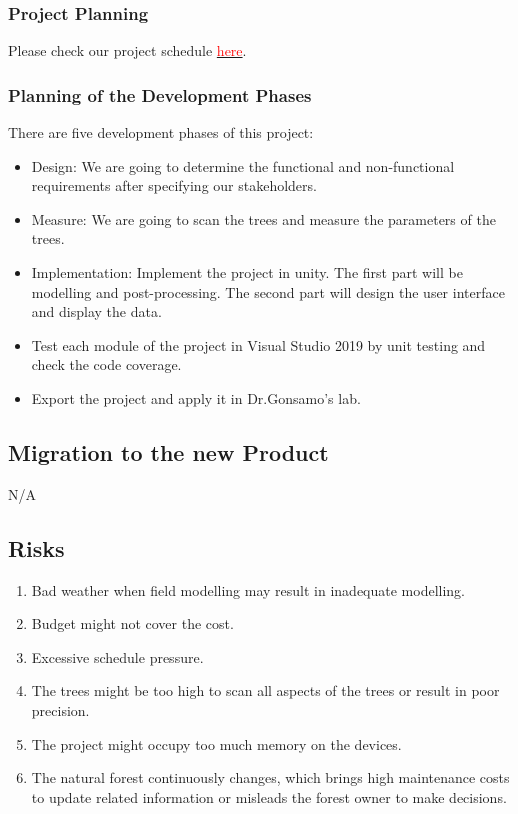 \documentclass{article}
\begin{document}
\subsubsection{Project Planning}
Please check our project schedule \href{https://github.com/wuj187/DigitalTwinCAS/tree/main/docs/DevelopmentPlan/Project_Schedule}{\textcolor{red}{here}}.
\subsubsection{Planning of the Development Phases}
There are five development phases of this project:
\begin{itemize}
    \item Design: We are going to determine the functional and non-functional requirements after specifying our stakeholders.
    \item Measure: We are going to scan the trees and measure the parameters of the trees.
    \item Implementation: Implement the project in unity. The first part will be modelling and post-processing. The second part will design the user interface and display the data.
    \item Test each module of the project in Visual Studio 2019 by unit testing and check the code coverage.
    \item Export the project and apply it in Dr.Gonsamo's lab.
\end{itemize}
\subsection{Migration to the new Product}
N/A
\subsection{Risks}
\begin{enumerate}
    \item Bad weather when field modelling may result in inadequate modelling.
    \item Budget might not cover the cost.
    \item Excessive schedule pressure.
    \item The trees might be too high to scan all aspects of the trees or result in poor precision.
    \item The project might occupy too much memory on the devices.
    \item The natural forest continuously changes, which brings high maintenance costs to update related information or misleads the forest owner to make decisions. 
\end{enumerate}
\end{document}
